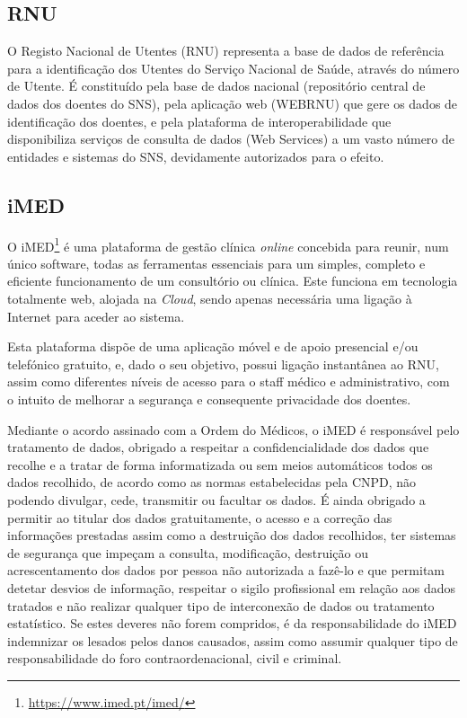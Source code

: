 \documentclass[conference]{IEEEtran}
\begin{document}
\subsection{RNU}

O Registo Nacional de Utentes (RNU) representa a base de dados de referência para a identificação dos Utentes do Serviço Nacional de Saúde, através do número de Utente. É constituído pela base de dados nacional (repositório central de dados dos doentes do SNS), pela aplicação web (WEBRNU) que gere os dados de identificação dos doentes, e pela plataforma de interoperabilidade que disponibiliza serviços de consulta de dados (Web Services) a um vasto número de entidades e sistemas do SNS, devidamente autorizados para o efeito.


\subsection{iMED}

O iMED\footnote{\url{https://www.imed.pt/imed/}} é uma plataforma de gestão clínica \textit{online} concebida para reunir, num único software, todas as ferramentas essenciais para um simples, completo e eficiente funcionamento de um consultório ou clínica. Este funciona em tecnologia totalmente web, alojada na \textit{Cloud}, sendo apenas necessária uma ligação à Internet para aceder ao sistema.

Esta plataforma dispõe de uma aplicação móvel e de apoio presencial e/ou telefónico gratuito, e, dado o seu objetivo, possui ligação instantânea ao RNU, assim como diferentes níveis de acesso para o staff médico e administrativo, com o intuito de melhorar a segurança e consequente privacidade dos doentes.

Mediante o acordo assinado com a Ordem do Médicos, o iMED é responsável pelo tratamento de dados, obrigado a respeitar a confidencialidade dos dados que recolhe e a tratar de forma informatizada ou sem meios automáticos todos os dados recolhido, de acordo como as normas estabelecidas pela CNPD, não podendo divulgar, cede, transmitir ou facultar os dados. É ainda obrigado a permitir ao titular dos dados gratuitamente, o acesso e a correção das informações prestadas assim como a destruição dos dados recolhidos, ter sistemas de segurança que impeçam a consulta, modificação, destruição ou acrescentamento dos dados por pessoa não autorizada a fazê-lo e que permitam detetar desvios de informação, respeitar o sigilo profissional em relação aos dados tratados e não realizar qualquer tipo de interconexão de dados ou tratamento estatístico. Se estes deveres não forem compridos, é da responsabilidade do iMED indemnizar os lesados pelos danos causados, assim como assumir qualquer tipo de responsabilidade do foro contraordenacional, civil e criminal.
\end{document}
